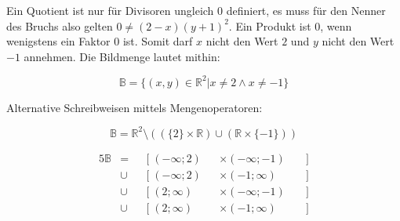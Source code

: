 \item 
Ein Quotient ist nur für Divisoren ungleich $0$ definiert, es muss für den Nenner des Bruchs also gelten $0 \ne (2-x)(y+1)^2$. Ein Produkt ist $0$, wenn wenigstens ein Faktor $0$ ist. Somit darf $x$ nicht den Wert $2$ und $y$ nicht den Wert $-1$ annehmen. Die Bildmenge lautet mithin:

$$\mathbb{B} = \lbrace (x,y) \in \mathbb{R}^2 | x \ne 2 \land x \ne -1 \rbrace$$

Alternative Schreibweisen mittels Mengenoperatoren:

$$\mathbb{B} = \mathbb{R}^2 \setminus ((\lbrace 2 \rbrace \times \mathbb{R})  \cup (\mathbb{R} \times \lbrace -1 \rbrace))$$

\begin{alignat*}{5}
  \mathbb{B} &=     &&[ \; (-\infty;2)  &&\times  (-\infty;-1) \; &&] \\
             &\cup  &&[ \; (-\infty;2)  &&\times  (-1;\infty)  \; &&] \\
             &\cup  &&[ \; (2;\infty)   &&\times  (-\infty;-1) \; &&] \\
             &\cup  &&[ \; (2;\infty)   &&\times  (-1;\infty)  \; &&]
\end{alignat*} 

